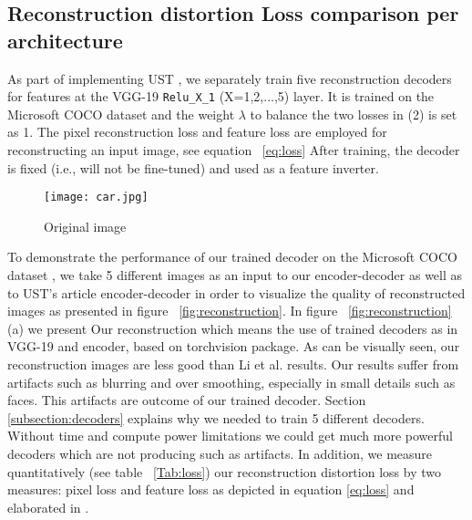 \subsection{Reconstruction distortion Loss comparison per architecture}
As part of implementing UST \cite{bib11}, we separately train five reconstruction decoders for features
at the VGG-19 \verb|Relu_X_1| (X=1,2,...,5) layer. It is trained on the Microsoft COCO dataset \cite{bib10} and
the weight $\lambda$ to balance the two losses in (2) is set as 1.
The pixel reconstruction loss \cite{bib22} and feature loss \cite{bib22, bib17} are employed for reconstructing an input image, see equation ~\ref{eq:loss}
After training, the decoder is fixed (i.e., will not be fine-tuned) and used as a feature inverter.\newline
\begin{center}
	\begin{figure}[H]
		\centering
		\texttt{[image: car.jpg]} %
		\caption{Original image}
	\end{figure}
\end{center}
To demonstrate the performance of our trained decoder on the Microsoft COCO dataset \cite{bib10}, we take 5 different images as an input to our encoder-decoder as well as to UST's article encoder-decoder in order to visualize the quality of reconstructed images as presented in figure ~\ref{fig:reconstruction}.\newline
In figure ~\ref{fig:reconstruction} (a) we present Our reconstruction which means the use of trained decoders as in VGG-19 \cite{bib20} and encoder, based on torchvision package.
As can be visually seen, our reconstruction images are less good than Li et al. \cite{bib11} results. Our results suffer from artifacts such as blurring and over smoothing, especially in small details such as faces. This artifacts are outcome of our trained decoder. Section \ref{subsection:decoders} explains why we needed to train 5 different decoders. Without time and compute power limitations we could get much more powerful decoders which are not producing such as artifacts.
In addition, we measure quantitatively (see table ~\ref{Tab:loss}) our reconstruction distortion loss by two measures: pixel loss and feature loss as depicted in equation \ref{eq:loss} and elaborated in \cite{bib22, bib17}.\newline

